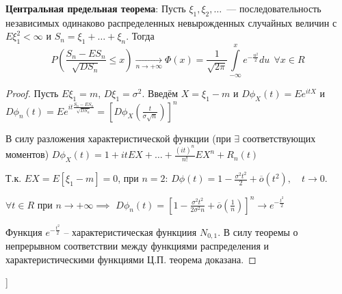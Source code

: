\textbf{Центральная предельная теорема}:
    Пусть $\xi_{1}, \xi_{2}, \ldots$~--- последовательность независимых одинаково распределенных невырожденных случайных величин с $E \xi_{1}^{2}<\infty$ и $S_{n}=\xi_{1}+\ldots+\xi_{n}$. 
    Тогда
    \begin{equation*}
        P\left(\frac{S_{n}-E S_{n}}{\sqrt{D S_{n}}} \leqslant x\right)
        \xrightarrow[n \to +\infty]{}
        \Phi(x) = \frac{1}{\sqrt{2 \pi}} \int\limits_{-\infty}^{x} e^{-\frac{u^{2}}{2}} du~~ \forall x \in R
    \end{equation*}

\begin{proof}
Пусть $E \xi_{1}=m,\, D \xi_{1}=\sigma^{2}$. 
Введём $X = \xi_1 - m$ и $D \phi_X(t)=E e^{i tX}$ и 
$
    D \phi_{n}(t)=E e^{i t \frac{S_{n}-E S_{n}}{\sqrt{D S_{n}}}} = 
    \left[D \phi_X\left(\frac{t}{\sigma \sqrt{n}}\right)\right]^{n}
$

В силу разложения характеристической функции (при $\exists$ соответствующих моментов)
$
    D \phi_{X}(t)=1+i t E X+\ldots+\frac{(i t)^{n}}{n !} E X^{n}+R_{n}(t)
$

Т.к. $E X = E \left[ \xi_1 - m\right] = 0$, при $n=2$: 
$
    D \phi(t)=1-\frac{\sigma^{2} t^{2}}{2}+\overline{o}\left(t^{2}\right), \quad t \to 0
$.

$\forall t \in R$ при $n \to +\infty \implies $
$
    D \phi_{n}(t)=\left[1-\frac{\sigma^{2} t^{2}}{2 \sigma^{2} n}+\overline{o}\left(\frac{1}{n}\right)\right]^n \to e^{-\frac{t^{2}}{2}}
$

Функция $e^{-\frac{t^{2}}{2}}$ -- характеристическая функциия $N_{0,1}$. 
В силу теоремы о непрерывном соответствии между функциями распределения и характеристическими функциями Ц.П. теорема доказана.
\end{proof}

\bigbreak
[\cite[page 1-53]{stat_book}]

